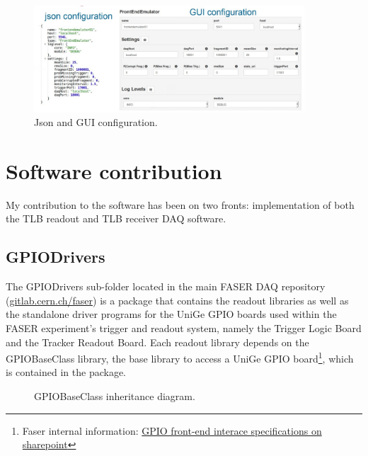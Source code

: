 \begin{figure}[htbp!] 
\centering    
\includegraphics[width=0.9\textwidth]{ChapterDAQ/Figs/GeneralDAQ/configuration.jpg}
\caption{Json and GUI configuration.}
\label{fig:ConfigurationJSON}
\end{figure}


\section{Software contribution}

My contribution to the software has been on two fronts: implementation of both the TLB readout and TLB receiver DAQ software. 

\subsection{GPIODrivers}

The GPIODrivers sub-folder located in the main FASER DAQ repository (\href{https://gitlab.cern.ch/faser}{gitlab.cern.ch/faser}) is a package that contains the readout libraries as well as the standalone driver programs for the UniGe GPIO boards used within the FASER experiment's trigger and readout system, namely the Trigger Logic Board and the Tracker Readout Board. Each readout library depends on the GPIOBaseClass library, the base library to access a UniGe GPIO board\footnote{Faser internal information: \href{https://espace.cern.ch/faser-share/Shared\%20Documents/Trigger,\%20DAQ\%20and\%20DCS/Unige\%20FrontEnd\%20Interface\%20-\%20UFE_Protocol-v1.4.pdf}{GPIO front-end interace specifications on sharepoint}}, which is contained in the package.

\begin{figure}[htbp!]
    \centering
    \caption{GPIOBaseClass inheritance diagram.}
    \label{fig:GPIOBaseClass}
\end{figure}


